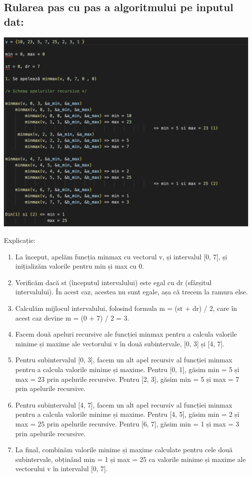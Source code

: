 \documentclass[runningheads]{llncs}
\begin{document}
\subsection{Rularea pas cu pas a algoritmului pe inputul dat: 
}
\begin{center}
    \includegraphics[scale=0.6]{p5.png}
\end{center}

Explicație:\newline

\begin{enumerate}
\item La început, apelăm funcția minmax cu vectorul v, și intervalul [0, 7], și inițializăm valorile pentru min și max cu 0.
\item Verificăm dacă st (începutul intervalului) este egal cu dr (sfârșitul intervalului). În acest caz, acestea nu sunt egale, așa că trecem la ramura else.
\item Calculăm mijlocul intervalului, folosind formula m = (st + dr) / 2, care în acest caz devine m = (0 + 7) / 2 = 3.
\item Facem două apeluri recursive ale funcției minmax pentru a calcula valorile minime și maxime ale vectorului v în două subintervale, [0, 3] și [4, 7].
\item Pentru subintervalul [0, 3], facem un alt apel recursiv al funcției minmax pentru a calcula valorile minime și maxime. Pentru [0, 1], găsim min = 5 și max = 23 prin apelurile recursive. Pentru [2, 3], găsim min = 5 și max = 7 prin apelurile recursive.
\item Pentru subintervalul [4, 7], facem un alt apel recursiv al funcției minmax pentru a calcula valorile minime și maxime. Pentru [4, 5], găsim min = 2 și max = 25 prin apelurile recursive. Pentru [6, 7], găsim min = 1 și max = 3 prin apelurile recursive.
\item La final, combinăm valorile minime și maxime calculate pentru cele două subintervale, obținând min = 1 și max = 25 ca valorile minime și maxime ale vectorului v în intervalul [0, 7].
\end{enumerate}
\end{document}
